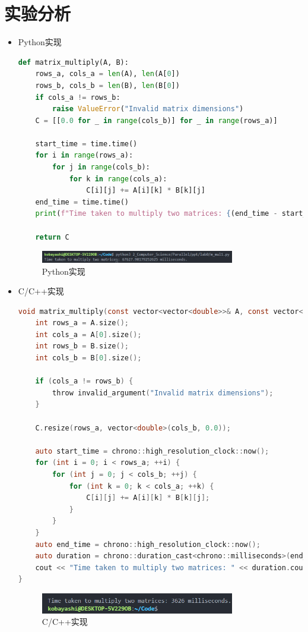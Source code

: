 \documentclass{SYSUReport}
\begin{document}
\section{实验分析}
\begin{itemize}
    \item Python实现
\begin{lstlisting}[language=Python]
def matrix_multiply(A, B):
    rows_a, cols_a = len(A), len(A[0])
    rows_b, cols_b = len(B), len(B[0])
    if cols_a != rows_b:
        raise ValueError("Invalid matrix dimensions")
    C = [[0.0 for _ in range(cols_b)] for _ in range(rows_a)]

    start_time = time.time()
    for i in range(rows_a):
        for j in range(cols_b):
            for k in range(cols_a):
                C[i][j] += A[i][k] * B[k][j]
    end_time = time.time()
    print(f"Time taken to multiply two matrices: {(end_time - start_time) * 1000} milliseconds.")

    return C
\end{lstlisting}
\begin{figure}[H]
    \centering
    \includegraphics[width=0.8\textwidth]{figures/m_mul1.png}
    \caption{Python实现}
\end{figure}

    \item C/C++实现
\begin{lstlisting}[language=C]
void matrix_multiply(const vector<vector<double>>& A, const vector<vector<double>>& B, vector<vector<double>>& C) {
    int rows_a = A.size();
    int cols_a = A[0].size();
    int rows_b = B.size();
    int cols_b = B[0].size();

    if (cols_a != rows_b) {
        throw invalid_argument("Invalid matrix dimensions");
    }

    C.resize(rows_a, vector<double>(cols_b, 0.0));

    auto start_time = chrono::high_resolution_clock::now();
    for (int i = 0; i < rows_a; ++i) {
        for (int j = 0; j < cols_b; ++j) {
            for (int k = 0; k < cols_a; ++k) {
                C[i][j] += A[i][k] * B[k][j];
            }
        }
    }
    auto end_time = chrono::high_resolution_clock::now();
    auto duration = chrono::duration_cast<chrono::milliseconds>(end_time - start_time);
    cout << "Time taken to multiply two matrices: " << duration.count() << " milliseconds." << endl;
}
\end{lstlisting}
\begin{figure}[H]
    \centering
    \includegraphics[width=0.8\textwidth]{figures/m_mul2.png}
    \caption{C/C++实现}
\end{figure}


\end{itemize}
\end{document}
